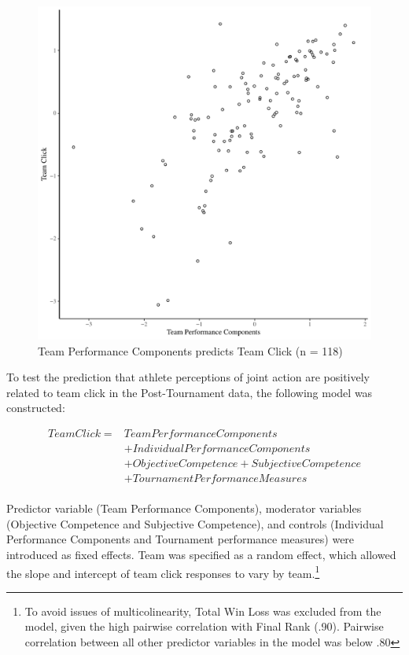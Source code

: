 \begin{CJK}{UTF8}{gbsn}
\begin{figure}[htbp]
  \centering
\includegraphics[scale=.5]{images/jasClickBasicXY.pdf}
  \caption{Team Performance Components predicts Team Click (n = 118)}
  \label{fig:jasClickBasicXY}
\end{figure}


To test the prediction that athlete perceptions of joint action are positively
related to team click in the Post-Tournament data, the following model was constructed:


  \begin{align*}
    Team Click =  & Team Performance Components\\
              & + Individual Performance Components \\
              & + Objective Competence + Subjective Competence\\
              & + TournamentPerformanceMeasures \\
  \end{align*}

\bigskip

Predictor variable (Team Performance Components), moderator variables (Objective Competence and Subjective Competence), and controls (Individual Performance Components and Tournament performance measures) were introduced as fixed effects.   Team was specified as a random effect, which allowed the slope and intercept of team click responses to vary by team.\footnote{To avoid issues of multicolinearity, Total Win Loss was excluded from the model, given the high pairwise correlation with Final Rank (.90). Pairwise correlation between all other predictor variables in the model was below .80}


\end{CJK}
